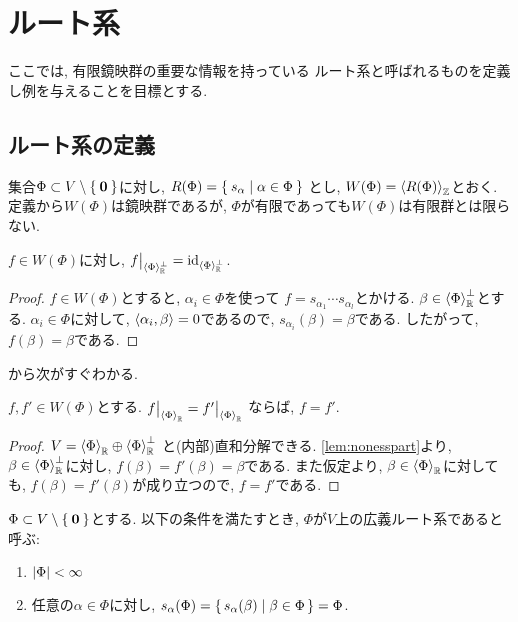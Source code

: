 \chapter{ルート系}

ここでは,
有限鏡映群の重要な情報を持っている
ルート系と呼ばれるものを定義し例を与えることを目標とする.

\section{ルート系の定義}

集合$\Phi\subset V\setminus \Set{\boldsymbol{0}}$に対し,
$R(\Phi)=\Set{s_\alpha | \alpha \in \Phi}$
とし,
$W(\Phi)=\Braket{R(\Phi)}_{\mathbb{Z}}$とおく.
定義から$W(\Phi)$は鏡映群であるが,
$\Phi$が有限であっても$W(\Phi)$は有限群とは限らない.

\begin{lemma}
  \label{lem:nonesspart}
  $f\in W(\Phi)$に対し,
  $f\bigr|_{\Braket{\Phi}_{\mathbb{R}}^{\perp}}=\operatorname{id}_{\Braket{\Phi}_{\mathbb{R}}^{\perp}}$.
\end{lemma}
\begin{proof}
  $f\in W(\Phi)$とすると,
  $\alpha_i\in \Phi$を使って
  $f=s_{\alpha_1}\cdots s_{\alpha_l}$とかける.
  $\beta\in \Braket{\Phi}_{\mathbb{R}}^{\perp}$とする.
  $\alpha_i\in \Phi$に対して,
  $\Braket{\alpha_i,\beta}=0$であるので,
  $s_{\alpha_i}(\beta)=\beta$である.
  したがって, 
  $f(\beta)=\beta$である.
\end{proof}

から次がすぐわかる.
\begin{lemma}
  \label{lem:esspart:eq}
  $f,f'\in W(\Phi)$とする.
  $f\bigr|_{\Braket{\Phi}_{\mathbb{R}}}=f'\bigr|_{\Braket{\Phi}_{\mathbb{R}}}$
  ならば,
  $f=f'$.
\end{lemma}
\begin{proof}
  $V=\Braket{\Phi}_{\mathbb{R}}\oplus \Braket{\Phi}_{\mathbb{R}}^\perp$
  と(内部)直和分解できる.
  \cref{lem:nonesspart}より,
  $\beta\in \Braket{\Phi}_{\mathbb{R}}^\perp$に対し,
  $f(\beta)=f'(\beta)=\beta$である.
  また仮定より, $\beta\in \Braket{\Phi}_{\mathbb{R}}$に対しても,
  $f(\beta)=f'(\beta)$が成り立つので,
  $f=f'$である.  
\end{proof}


\begin{definition}
  $\Phi \subset V \setminus \Set{\boldsymbol{0}}$とする.
  以下の条件を満たすとき, $\Phi$が$V$上の広義ルート系であると呼ぶ:
  \begin{enumerate}
  \item $\left|\Phi\right|<\infty$
  \item 任意の$\alpha \in \Phi$に対し,
    $s_\alpha (\Phi) = \set{s_\alpha(\beta)|\beta\in \Phi}=\Phi$.
  \end{enumerate}
\end{definition}

